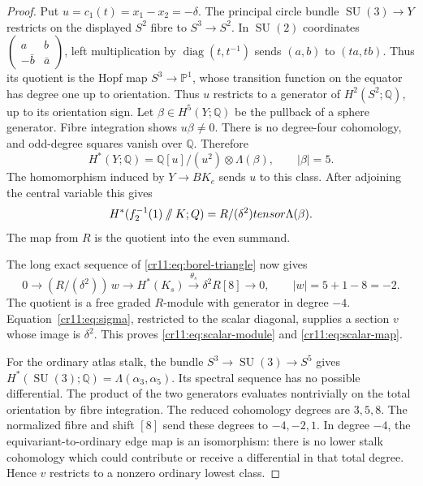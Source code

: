 \begin{proof}
Put $u=c_1(t)=x_1-x_2=-\delta$.
The principal circle bundle
$\operatorname{SU}(3)\to Y$ restricts on the displayed $S^2$ fibre
to $S^3\to S^2$.
In $\operatorname{SU}(2)$ coordinates
$\left(\begin{smallmatrix}a&b\\-\bar b&\bar a\end{smallmatrix}\right)$,
left multiplication by $\operatorname{diag}(t,t^{-1})$ sends
$(a,b)$ to $(ta,tb)$.
Thus its quotient is the Hopf map $S^3\to\mathbb P^1$,
whose transition function on the equator has degree one up to orientation.
Thus $u$ restricts to a generator of $H^2(S^2;\mathbb Q)$, up to
its orientation sign.
Let $\beta\in H^5(Y;\mathbb Q)$ be the pullback of a sphere generator.
Fibre integration shows $u\beta\ne0$.
There is no degree-four cohomology, and odd-degree squares vanish over
$\mathbb Q$. Therefore
\[
 H^*(Y;\mathbb Q)=\mathbb Q[u]/(u^2)\otimes\Lambda(\beta),
 \qquad |\beta|=5.
\]
The homomorphism induced by $Y\to BK_e$ sends $u$ to this class.
After adjoining the central variable this gives
\begin{equation}
 H^*(f_2^{-1}(1)\mathbin{/\mkern-6mu/}K;\mathbb Q)
       =R/(\delta^2)\otimes\Lambda(\beta).
 \label{cr11:eq:borel-fibre}
\end{equation}
The map from $R$ is the quotient into the even summand.

The long exact sequence of \eqref{cr11:eq:borel-triangle} now gives
\[
 0\longrightarrow (R/(\delta^2))\,w
 \longrightarrow H^*(K_s)
 \xrightarrow{\theta_s}\delta^2R[8]
 \longrightarrow0,
 \qquad |w|=5+1-8=-2.
\]
The quotient is a free graded $R$-module with generator in degree $-4$.
Equation~\eqref{cr11:eq:sigma}, restricted to the scalar diagonal,
supplies a section $v$ whose image is $\delta^2$.
This proves \eqref{cr11:eq:scalar-module} and \eqref{cr11:eq:scalar-map}.

For the ordinary atlas stalk, the bundle
$S^3\to\operatorname{SU}(3)\to S^5$ gives
$H^*(\operatorname{SU}(3);\mathbb Q)=\Lambda(\alpha_3,\alpha_5)$.
Its spectral sequence has no possible differential.
The product of the two generators evaluates nontrivially on the total
orientation by fibre integration.
The reduced cohomology degrees are $3,5,8$.
The normalized fibre and shift $[8]$ send these degrees to $-4,-2,1$.
In degree $-4$, the equivariant-to-ordinary edge map is an isomorphism:
there is no lower stalk cohomology which could contribute or receive
a differential in that total degree.
Hence $v$ restricts to a nonzero ordinary lowest class.
\end{proof}

